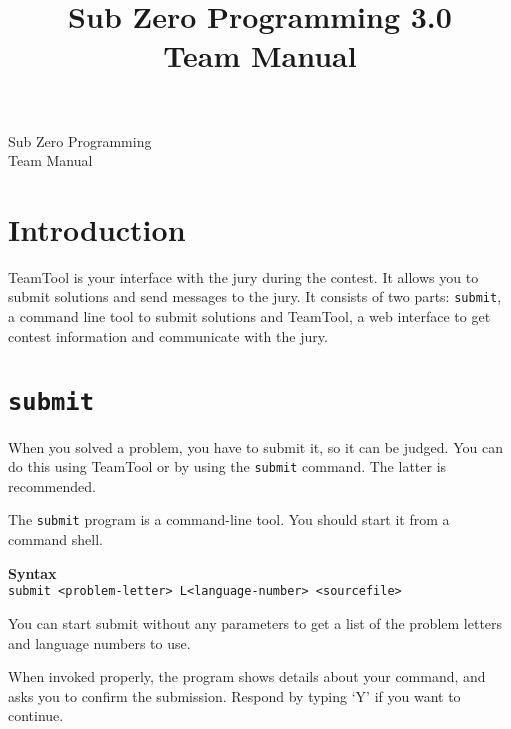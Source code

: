 \documentclass[a4paper]{artikel3}
\title{ Sub Zero Programming 3.0 \\ Team Manual }
\newcommand{\cmd}[1]{\texttt{#1}}
\newcommand{\syntax}[1]{\textbf{Syntax}\\\cmd{#1}}
\begin{document}
\begin{titlepage}
\begin{center}

\vspace{2cm}
{\Huge Sub Zero Programming} \\
\vspace{1cm}
{\Huge Team Manual} \\
\vspace{5cm}


\end{center}
\end{titlepage}


\bigskip

\vspace{-0.8cm}
\section{Introduction}

TeamTool is your interface with the jury during the contest. It allows you
to submit solutions and send messages to the jury. It consists of two parts:
\cmd{submit}, a command line tool to submit solutions and TeamTool, a web
interface to get contest information and communicate with the jury.

\vspace{-0.8cm}
\section{\cmd{submit}}

\label{sec:submit}

When you solved a problem, you have to submit it, so it can be judged. You
can do this using TeamTool or by using the \cmd{submit} command. The latter
is recommended.

The \cmd{submit} program is a command-line tool. You should start it from a
command shell.

\syntax{submit <problem-letter> L<language-number> <sourcefile>}

You can start submit without any parameters to get a list of the problem
letters and language numbers to use.

When invoked properly, the program shows details about your command, and
asks you to confirm the submission. Respond by typing `Y' if you want to
continue.
\end{document}
